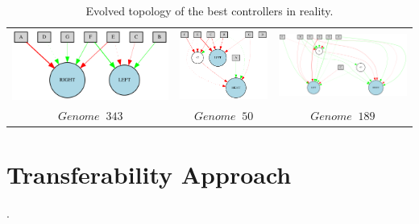 \begin{table}[h]
\begin{tabular}{ccc}
\includegraphics[scale=0.4]{include/images/thymio_network_343.PNG} & \includegraphics[scale=0.4]{include/images/thymio_network_50.PNG} & \includegraphics[scale=0.4]{include/images/thymio_network_189.PNG} \\
$Genome \;  \; 343$  & $Genome \;  \; 50$  & $Genome \;  \; 189$  \\
\end{tabular}
\caption{Evolved topology of the best controllers in reality.}
\label{fig:thymio_network_topologies} %
\end{table}

\section{Transferability Approach}.

